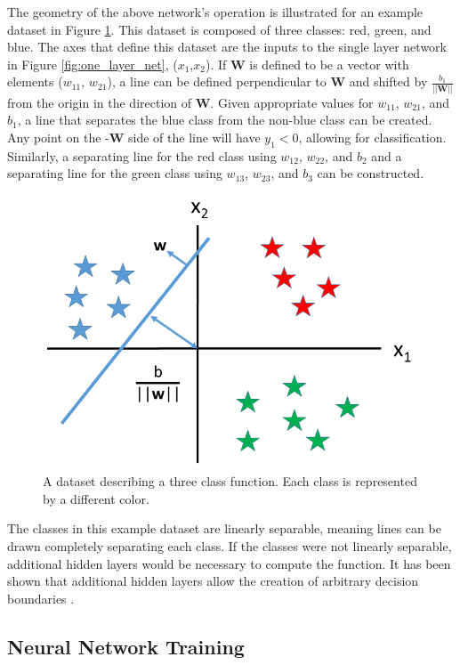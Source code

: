 %
The geometry of the above network's operation is illustrated for an example dataset in Figure \ref{fig:training_set_one_layer}. This dataset is composed of three classes: red, green, and blue. The axes that define this dataset are the inputs to the single layer network in Figure \ref{fig:one_layer_net}, ($x_1$,$x_2$). If $\mathbf{W}$ is defined to be a vector with elements ($w_{11}$, $w_{21}$), a line can be defined perpendicular to $\mathbf{W}$ and shifted by $\frac{b_1}{||\mathbf{W}||}$ from the origin in the direction of $\mathbf{W}$. Given appropriate values for $w_{11}$, $w_{21}$, and $b_1$, a line that separates the blue class from the non-blue class can be created. Any point on the -$\mathbf{W}$ side of the line will have $y_1 < 0$, allowing for classification. Similarly, a separating line for the red class using $w_{12}$, $w_{22}$, and $b_2$ and a separating line for the green class using $w_{13}$, $w_{23}$, and $b_3$ can be constructed. 
\begin{figure}[H]
	\centering
	\includegraphics[width=0.65\linewidth]{images/training_set_for_single_layer_hyperplane_v2}
	\caption{A dataset describing a three class function. Each class is represented by a different color.}
	\label{fig:training_set_one_layer}
\end{figure}

The classes in this example dataset are linearly separable, meaning lines can be drawn completely separating each class. If the classes were not linearly separable, additional hidden layers would be necessary to compute the function. It has been shown that additional hidden layers allow the creation of arbitrary decision boundaries \cite{Hornik1991}. 

\subsection{Neural Network Training}

